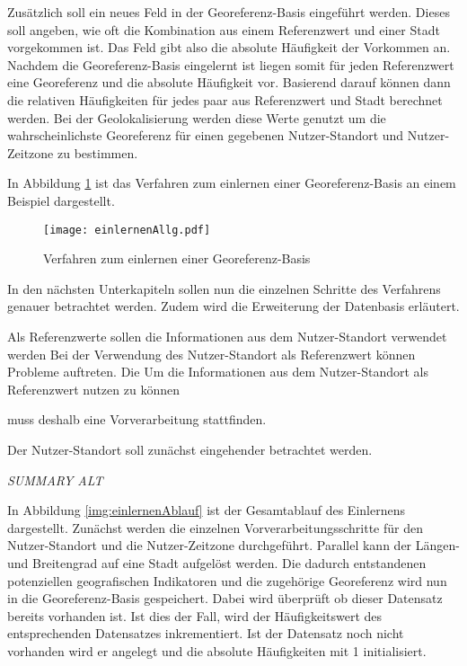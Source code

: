 			Zusätzlich soll ein neues Feld in der Georeferenz-Basis eingeführt werden.
			Dieses soll angeben, wie oft die Kombination aus einem Referenzwert und einer Stadt vorgekommen ist. 
			Das Feld gibt also die absolute Häufigkeit der Vorkommen an.
			Nachdem die Georeferenz-Basis eingelernt ist liegen somit für jeden Referenzwert eine Georeferenz und die absolute Häufigkeit vor.
			Basierend darauf können dann die relativen Häufigkeiten für jedes paar aus Referenzwert und Stadt berechnet werden.
			Bei der Geolokalisierung werden diese Werte genutzt um die wahrscheinlichste Georeferenz für einen gegebenen Nutzer-Standort und Nutzer-Zeitzone zu bestimmen.

			In Abbildung \ref{img:EinlernenAllg} ist das Verfahren zum einlernen einer Georeferenz-Basis an einem Beispiel dargestellt.

			\begin{figure}[!ht]
					\begin{center}
						\texttt{[image: einlernenAllg.pdf]}
						\caption{Verfahren zum einlernen einer Georeferenz-Basis}
						\label{img:EinlernenAllg}
					\end{center}
			\end{figure}	

			In den nächsten Unterkapiteln sollen nun die einzelnen Schritte des Verfahrens genauer betrachtet werden. 
			Zudem wird die Erweiterung der Datenbasis erläutert.
	           
			Als Referenzwerte sollen die Informationen aus dem Nutzer-Standort verwendet werden 
			Bei der Verwendung des Nutzer-Standort als Referenzwert können Probleme auftreten. 
			Die 
			Um die Informationen aus dem Nutzer-Standort als Referenzwert nutzen zu können 

			muss deshalb eine Vorverarbeitung stattfinden. 

			Der Nutzer-Standort soll zunächst eingehender betrachtet werden.

		\textit{SUMMARY ALT} 
			
			In Abbildung \ref{img:einlernenAblauf} ist der Gesamtablauf des Einlernens dargestellt.  
			Zunächst werden die einzelnen Vorverarbeitungsschritte für den Nutzer-Standort und die Nutzer-Zeitzone durchgeführt.
			Parallel kann der Längen- und Breitengrad auf eine Stadt aufgelöst werden.
			Die dadurch entstandenen potenziellen geografischen Indikatoren und die zugehörige Georeferenz wird nun in die Georeferenz-Basis gespeichert. 
			Dabei wird überprüft ob dieser Datensatz bereits vorhanden ist. 
			Ist dies der Fall, wird der Häufigkeitswert des entsprechenden Datensatzes inkrementiert.
			Ist der Datensatz noch nicht vorhanden wird er angelegt und die absolute Häufigkeiten mit 1 initialisiert.

